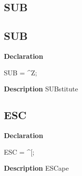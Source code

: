 \documentclass{report}
\newif\ifpdf
\begin{document}
\subsection*{\large{\textbf{SUB}}\normalsize\hspace{1ex}\hrulefill}
\else
\subsection*{SUB}
\fi
\label{ok_caret_character-SUB}
\begin{list}{}{
\setlength{\itemindent}{0cm}
\setlength{\listparindent}{0cm}
\setlength{\leftmargin}{\evensidemargin}
\addtolength{\leftmargin}{\tmplength}
\settowidth{\labelsep}{X}
\addtolength{\leftmargin}{\labelsep}
\setlength{\labelwidth}{\tmplength}
}
\item[\textbf{Declaration}\hfill]
\ifpdf
\begin{flushleft}
\fi
\begin{ttfamily}
SUB = {\^{}}Z;\end{ttfamily}

\ifpdf
\end{flushleft}
\fi

\par
\item[\textbf{Description}]
SUBstitute

\end{list}
\ifpdf
\subsection*{\large{\textbf{ESC}}\normalsize\hspace{1ex}\hrulefill}
\else
\subsection*{ESC}
\fi
\label{ok_caret_character-ESC}
\begin{list}{}{
\setlength{\itemindent}{0cm}
\setlength{\listparindent}{0cm}
\setlength{\leftmargin}{\evensidemargin}
\addtolength{\leftmargin}{\tmplength}
\settowidth{\labelsep}{X}
\addtolength{\leftmargin}{\labelsep}
\setlength{\labelwidth}{\tmplength}
}
\item[\textbf{Declaration}\hfill]
\ifpdf
\begin{flushleft}
\fi
\begin{ttfamily}
ESC = {\^{}}[;\end{ttfamily}

\ifpdf
\end{flushleft}
\fi

\par
\item[\textbf{Description}]
ESCape

\end{list}
\ifpdf
\end{document}
